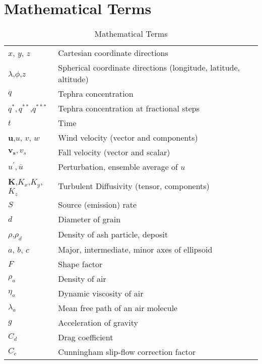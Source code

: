 \chapter{Mathematical Terms}\label{ChapAppendMathTerms}
\begin{table}
\caption{\label{TabNotation}
Mathematical Terms}
\centering
\begin{tabular}{ll}
\hline
$x$, $y$, $z$                    & Cartesian coordinate directions \\
$\lambda$,$\phi$,$z$             & Spherical coordinate directions (longitude, latitude, altitude) \\
$q$                              & Tephra concentration \\
$q^{*},q^{**}$,$q^{***}$                   & Tephra concentration at fractional steps\\
$t$                              & Time \\
$\mathbf{u}$,$u$, $v$, $w$       & Wind velocity (vector and components) \\
$\mathbf{v_s}, v_s$              & Fall velocity (vector and scalar) \\
$u^{\prime},\bar{u}$             & Perturbation, ensemble average of $u$\\
$\mathbf{K}$,$K_x$,$K_y$,$K_z$   & Turbulent Diffusivity (tensor, components) \\
$S$                              & Source (emission) rate  \\
$d$                              & Diameter of grain \\
$\rho$,$\rho_d$                  & Density of ash particle, deposit \\
$a$, $b$, $c$                    & Major, intermediate, minor axes of ellipsoid \\
$F$                              & Shape factor \\
$\rho_a$                         & Density of air \\
$\eta_a$                         & Dynamic viscosity of air \\
$\lambda_a$                      & Mean free path of an air molecule \\
$g$                              & Acceleration of gravity \\
$C_d$                            & Drag coefficient \\
$C_c$                            & Cunningham slip-flow correction factor \\

\end{tabular}
\end{table}
